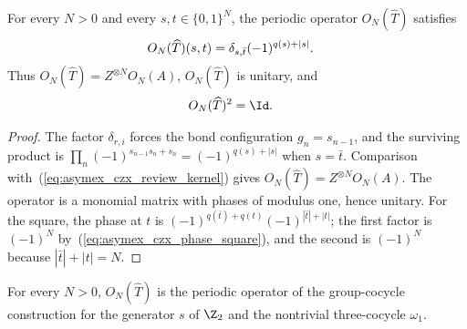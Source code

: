 \begin{lemma}
    \label{thm:asymex_czx_decorated_operator}
    \leanok
    For every $N>0$ and every $s,t\in\{0,1\}^N$, the periodic operator
    $O_N(\widehat T)$ satisfies
    \begin{align}
        O_N(\widehat T)(s,t) & =\delta_{s,\bar t}(-1)^{q(s)+|s|}.
        \notag
    \end{align}
    Thus $O_N(\widehat T)=Z^{\otimes N}O_N(A)$, $O_N(\widehat T)$ is unitary, and
    \begin{align}
        O_N(\widehat T)^2 & =\Id.
        \notag
    \end{align}
\end{lemma}

\begin{proof}
    \leanok
    The factor $\delta_{r,i}$ forces the bond configuration $g_n=s_{n-1}$,
    and the surviving product is
    $\prod_n(-1)^{s_{n-1}s_n+s_n}=(-1)^{q(s)+|s|}$ when $s=\bar t$.
    Comparison with~(\ref{eq:asymex_czx_review_kernel}) gives
    $O_N(\widehat T)=Z^{\otimes N}O_N(A)$. The operator is a monomial matrix with
    phases of modulus one, hence unitary. For the square, the phase at $t$
    is $(-1)^{q(\bar t)+q(t)}(-1)^{|\bar t|+|t|}$; the first factor is
    $(-1)^N$ by~(\ref{eq:asymex_czx_phase_square}), and the second is
    $(-1)^N$ because $|\bar t|+|t|=N$.
\end{proof}

\begin{lemma}
    \label{thm:asymex_czx_decorated_group_cocycle}
    \leanok
    For every $N>0$, $O_N(\widehat T)$ is the periodic operator of the
    group-cocycle construction for the generator $s$ of $\Z_2$ and the
    nontrivial three-cocycle $\omega_1$.
\end{lemma}

